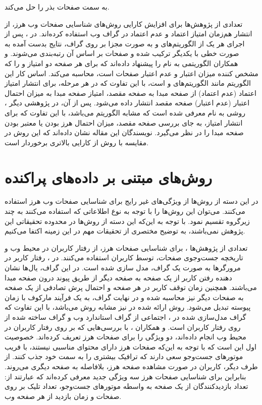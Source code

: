 \documentclass[twoside, a4paper,11pt]{book}
\numberwithin{equation}{chapter}
\numberwithin{table}{chapter}
\numberwithin{figure}{chapter}
\numberwithin{equation}{chapter}
\begin{document}
به سمت صفحات بذر را حل می‌کند. 

تعدادی از پژوهش‌ها برای افزایش کارایی روش‌های شناسایی صفحات وب هرز، از انتشار هم‌زمان امتیاز اعتماد و عدم اعتماد در گراف وب استفاده کرده‌اند. در \cite{wu2006propagating}،  پس از اجرای هر یک از الگوریتم‌های  و  به صورت مجزا بر روی گراف، نتایج بدست آمده به صورت خطی با یکدیگر ترکیب شده و صفحات بر اساس آن رتبه‌بندی می‌شوند.  و همکاران \cite{zhang2011propagating} الگوریتمی به نام  را پیشنهاد داده‌اند که برای هر صفحه دو امتیاز  و  را که مشخص کننده‌ میزان اعتبار و عدم اعتبار صفحات است، محاسبه می‌کند. اساس کار این الگوریتم مانند الگوریتم‌های  و  است، با این تفاوت که در هر مرحله، برای انتشار امتیاز اعتماد (عدم اعتماد) از صفحه مبدا به صفحه مقصد، امتیاز صفحه مبدا به میزان احتمال اعتبار (عدم اعتبار) صفحه مقصد انتشار داده می‌شود. پس از آن، در پژوهشی دیگر \cite{liu2013combating}، روشی به نام  معرفی شده است که مشابه الگوریتم  می‌باشد، با این تفاوت که برای انتشار امتیاز، به جای بررسی صفحه مقصد، میزان احتمال هرز بودن یا معتبر بودن صفحه مبدا را در نظر می‌گیرد. نویسندگان این مقاله نشان داده‌اند که این روش در مقایسه با روش   از کارایی بالاتری برخوردار است.

\section{‌روش‌های مبتنی بر داده‌های پراکنده}
\label{section:relatedwork-userfeedback}
در این دسته از روش‌ها از ویژگی‌های غیر رایج برای شناسایی صفحات وب هرز استفاده می‌کنند. می‌توان این روش‌ها را با توجه به نوع اطلاعاتی که استفاده می‌کنند به چند زیرگروه تقسیم نمود. با توجه به این‌که این دسته از روش‌ها در محدوده تحقیقاتی این پژوهش نمی‌باشند، به توضیح مختصری از تحقیقات مهم در این زمینه اکتفا می‌کنیم.

تعدادی از پژوهش‌ها \cite{liu2008browserank, poblete2008dr, liu2008user}، برای شناسایی صفحات هرز، از رفتار کاربران در محیط وب و تاریخچه‌ جست‌و‌جوی صفحات، توسط کاربران استفاده می‌کنند. در \cite{liu2008browserank}، رفتار کاربر در مرورگرها به صورت یک گراف، مدل سازی شده است. در این گراف، یال‌ها نشان دهنده رفتن کاربر از یک صفحه به صفحه دیگر از طریق پیوند درون صفحه مبدا می‌باشند. همچنین زمان توقف کاربر در هر صفحه و احتمال پرش تصادفی از یک صفحه به صفحات دیگر نیز محاسبه شده و در نهایت گراف، به یک فرآیند مارکوف با زمان پیوسته تبدیل می‌شود. روش ارائه شده در \cite{poblete2008dr} نیز مشابه روش \cite{liu2008browserank} می‌باشد، با این تفاوت که گراف مدل‌سازی شده در \cite{poblete2008dr}، اجتماعی از گراف استاندارد وب و گراف ساخته شده از روی رفتار کاربران است.  و همکاران \cite{liu2008user}، با بررسی‌هایی که بر روی رفتار کاربران در محیط وب انجام داده‌اند، دو ویژگی را برای صفحات هرز تعریف کرده‌اند. خصوصیت اول این است که با توجه به این‌که صفحات هرز دارای محتوای مناسبی نیستند، با فریب موتورهای جست‌و‌جو سعی دارند که ترافیک بیشتری را به سمت خود جذب کنند. از طرف دیگر، کاربران در صورت مشاهده صفحه هرز، بلافاصله به صفحه‌ دیگری می‌روند. بنابراین برای شناسایی صفحات هرز سه ویژگی جدید معرفی کرده‌اند که عبارتند از: تعداد بازدیدکنندگان از یک صفحه به واسطه موتورهای جست‌و‌جو، تعداد تلیک بر روی صفحات و  زمان بازدید از هر صفحه وب.
\end{document}
